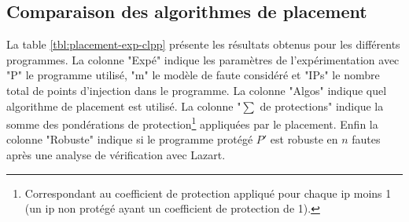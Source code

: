         \subsection{Comparaison des algorithmes de placement}
        \label{sec:placement-exp-res}

            La table \ref{tbl:placement-exp-clpp} présente les résultats obtenus pour les différents programmes.
            La colonne "Expé" indique les paramètres de l'expérimentation avec "P" le programme utilisé, "m" le modèle de faute considéré et "IPs" le nombre total de points d'injection dans le programme.
            La colonne "Algos" indique quel algorithme de placement est utilisé.
            La colonne "$\sum$ de protections" indique la somme des pondérations de protection\footnote{Correspondant au coefficient de protection appliqué pour chaque \gls{ip} moins 1 (un \gls{ip} non protégé ayant un coefficient de protection de 1).} appliquées par le placement.
            Enfin la colonne "Robuste" indique si le programme protégé $P'$ est robuste en $n$ fautes après une analyse de vérification avec Lazart.
            
